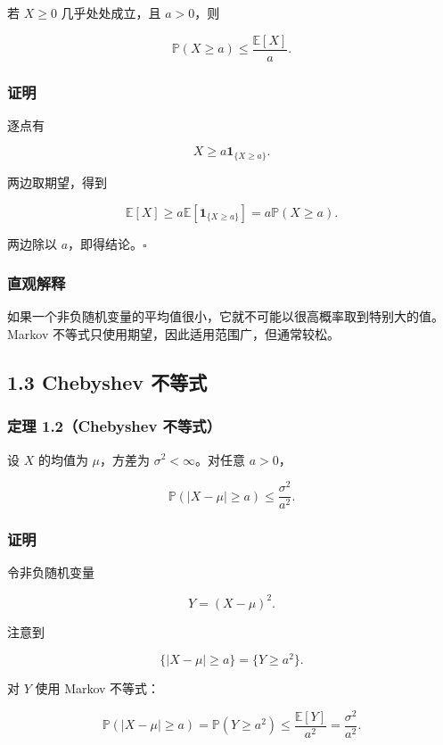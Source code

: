 \documentclass[
  11pt,
  a4paper,
]{ctexart}
\begin{document}
若 \(X\ge 0\) 几乎处处成立，且 \(a>0\)，则

\[
\mathbb P(X\ge a)\le \frac{\mathbb E[X]}{a}.
\]

\subsubsection{证明}\label{ux8bc1ux660e}

逐点有

\[
X\ge a\mathbf1_{\{X\ge a\}}.
\]

两边取期望，得到

\[
\mathbb E[X]
\ge a\mathbb E[\mathbf1_{\{X\ge a\}}]
=a\mathbb P(X\ge a).
\]

两边除以 \(a\)，即得结论。\(\square\)

\subsubsection{直观解释}\label{ux76f4ux89c2ux89e3ux91ca}

如果一个非负随机变量的平均值很小，它就不可能以很高概率取到特别大的值。Markov
不等式只使用期望，因此适用范围广，但通常较松。

\subsection{1.3 Chebyshev 不等式}\label{chebyshev-ux4e0dux7b49ux5f0f}

\subsubsection{定理 1.2（Chebyshev
不等式）}\label{ux5b9aux7406-1.2chebyshev-ux4e0dux7b49ux5f0f}

设 \(X\) 的均值为 \(\mu\)，方差为 \(\sigma^2<\infty\)。对任意 \(a>0\)，

\[
\mathbb P(|X-\mu|\ge a)
\le \frac{\sigma^2}{a^2}.
\]

\subsubsection{证明}\label{ux8bc1ux660e-1}

令非负随机变量

\[
Y=(X-\mu)^2.
\]

注意到

\[
\{|X-\mu|\ge a\}=\{Y\ge a^2\}.
\]

对 \(Y\) 使用 Markov 不等式：

\[
\mathbb P(|X-\mu|\ge a)
=\mathbb P(Y\ge a^2)
\le\frac{\mathbb E[Y]}{a^2}
=\frac{\sigma^2}{a^2}.
\]
\end{document}
